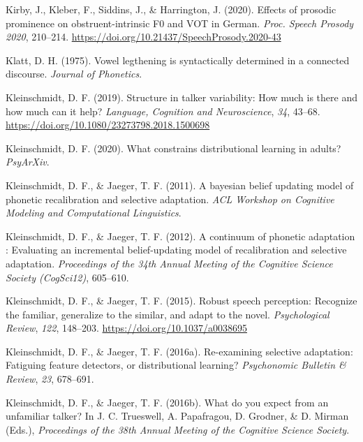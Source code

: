 \documentclass[
  11pt,
  english,
  man,floatsintext]{apa6}
\newlength{\cslhangindent}
\newlength{\cslentryspacingunit} %
\newenvironment{CSLReferences}[2] %
 {%
  \setlength{\parindent}{0pt}
  \ifodd #1
  \let\oldpar\par
  \def\par{\hangindent=\cslhangindent\oldpar}
  \fi
  \setlength{\parskip}{#2\cslentryspacingunit}
 }%
 {}
\begin{document}
\begin{CSLReferences}{1}{0}
\leavevmode{}%
Kirby, J., Kleber, F., Siddins, J., \& Harrington, J. (2020). {Effects of prosodic prominence on obstruent-intrinsic F0 and VOT in German}. \emph{Proc. Speech Prosody 2020}, 210--214. \url{https://doi.org/10.21437/SpeechProsody.2020-43}

\leavevmode{}%
Klatt, D. H. (1975). Vowel legthening is syntactically determined in a connected discourse. \emph{Journal of Phonetics}.

\leavevmode{}%
Kleinschmidt, D. F. (2019). Structure in talker variability: How much is there and how much can it help? \emph{Language, Cognition and Neuroscience}, \emph{34}, 43--68. \url{https://doi.org/10.1080/23273798.2018.1500698}

\leavevmode{}%
Kleinschmidt, D. F. (2020). What constrains distributional learning in adults? \emph{PsyArXiv}.

\leavevmode{}%
Kleinschmidt, D. F., \& Jaeger, T. F. (2011). A bayesian belief updating model of phonetic recalibration and selective adaptation. \emph{ACL Workshop on Cognitive Modeling and Computational Linguistics}.

\leavevmode{}%
Kleinschmidt, D. F., \& Jaeger, T. F. (2012). A continuum of phonetic adaptation : Evaluating an incremental belief-updating model of recalibration and selective adaptation. \emph{Proceedings of the 34th Annual Meeting of the Cognitive Science Society (CogSci12)}, 605--610.

\leavevmode{}%
Kleinschmidt, D. F., \& Jaeger, T. F. (2015). Robust speech perception: Recognize the familiar, generalize to the similar, and adapt to the novel. \emph{Psychological Review}, \emph{122}, 148--203. \url{https://doi.org/10.1037/a0038695}

\leavevmode{}%
Kleinschmidt, D. F., \& Jaeger, T. F. (2016a). Re-examining selective adaptation: Fatiguing feature detectors, or distributional learning? \emph{Psychonomic Bulletin \& Review}, \emph{23}, 678--691.

\leavevmode{}%
Kleinschmidt, D. F., \& Jaeger, T. F. (2016b). What do you expect from an unfamiliar talker? In J. C. Trueswell, A. Papafragou, D. Grodner, \& D. Mirman (Eds.), \emph{Proceedings of the 38th Annual Meeting of the Cognitive Science Society}.


\end{CSLReferences}
\end{document}
